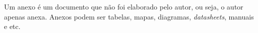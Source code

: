 \label{an:ex_anexo_a}

Um anexo é um documento que não foi elaborado pelo autor, ou seja, o autor apenas anexa. Anexos podem ser tabelas, mapas, diagramas, \textit{datasheets}, manuais e etc. 



